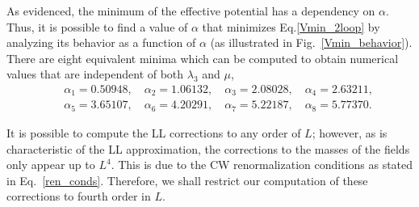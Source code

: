 \documentclass[11pt,a4paper,english,superscriptaddress,preprint,aps,prd]{revtex4}
\begin{document}
As evidenced, the minimum of the effective potential has a dependency on $\alpha$. Thus, it is possible to find a value of $\alpha$ that minimizes Eq.\eqref{Vmin_2loop} by analyzing its behavior as a function of $\alpha$ (as illustrated in Fig.~\ref{Vmin_behavior}). There are eight equivalent minima which can be computed to obtain numerical values that are independent of both $\lambda_3$ and $\mu$,
\begin{eqnarray*}
 &&\alpha_1 =0.50948,\quad \alpha_2 =1.06132,\quad \alpha_3 =2.08028,\quad \alpha_4 =2.63211,\nonumber\\
 && \alpha_5 =3.65107,\quad \alpha_6 =4.20291,\quad \alpha_7 =5.22187,\quad \alpha_8 =5.77370.
\end{eqnarray*}

It is possible to compute the LL corrections to any order of $L$; however, as is characteristic of the LL approximation, the corrections to the masses of the fields only appear up to $L^4$. This is due to the CW renormalization conditions as stated in Eq.~\eqref{ren_conds}. Therefore, we shall restrict our computation of these corrections to fourth order in $L$.

\end{document}
